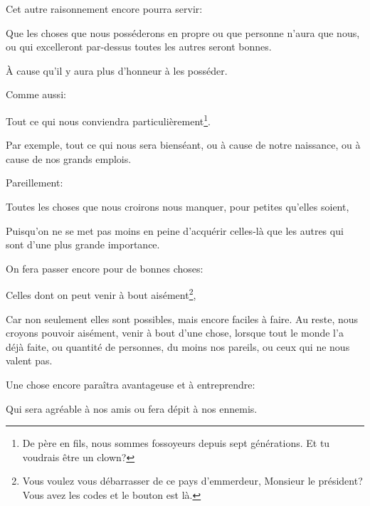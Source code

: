 \bigbreak

Cet autre raisonnement encore pourra servir:

\begin{lieu}
	Que les choses que nous posséderons en propre ou que personne n'aura que nous, ou qui excelleront par-dessus toutes les autres
	seront bonnes.
\end{lieu}

À cause qu'il y aura plus d'honneur à les posséder.

\bigbreak

Comme aussi:

\begin{lieu}
	Tout ce qui nous conviendra particulièrement\footnote{De père en fils, nous sommes fossoyeurs depuis sept générations. Et tu
	voudrais être un clown?}.
\end{lieu}

Par exemple, tout ce qui nous sera bienséant, ou à cause de notre naissance, ou à cause de nos grands emplois.

\bigbreak

Pareillement:

\begin{lieu}
	Toutes les choses que nous croirons nous manquer, pour petites qu'elles soient,
\end{lieu}

Puisqu'on ne se met pas moins en peine d'acquérir celles-là que les autres qui sont d'une plus grande importance.

\bigbreak

On fera passer encore pour de bonnes choses:

\begin{lieu}
	Celles dont on peut venir à bout aisément\footnote{Vous voulez vous débarrasser de ce pays d'emmerdeur, Monsieur le
	président? Vous avez les codes et le bouton est là.},
\end{lieu}

Car non seulement elles sont possibles, mais encore faciles à faire. Au reste, nous croyons pouvoir aisément, venir à
bout d'une chose, lorsque tout le monde l'a déjà faite, ou quantité de personnes, du moins nos pareils, ou ceux qui ne
nous valent pas.

\bigbreak

Une chose encore paraîtra avantageuse et à entreprendre:

\begin{lieu}
	Qui sera agréable à nos amis ou fera dépit à nos ennemis.
\end{lieu}

